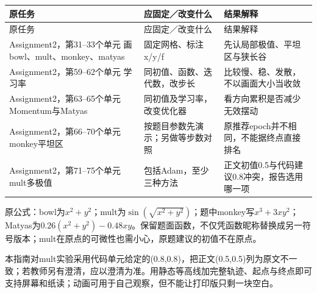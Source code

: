 \begingroup
\small\setlength{\tabcolsep}{3pt}
\renewcommand{\arraystretch}{1.22}
\begin{longtable}{@{}>{\raggedright\arraybackslash}p{}>{\raggedright\arraybackslash}p{}>{\raggedright\arraybackslash}p{}@{}}
\toprule
原任务 & 应固定／改变什么 & 结果解释 \\
\midrule\endfirsthead
原任务 & 应固定／改变什么 & 结果解释 \\
\midrule\endhead
\bottomrule\endfoot
Assignment2，第31–33个单元 画bowl、mult、monkey、matyas & 固定网格、标注x/y/f & 先认局部极值、平坦区与狭长谷 \\
Assignment2，第59–62个单元 学习率 & 同初值、函数、迭代数，改步长 & 比较慢、稳、发散，不以画面大小当收敛 \\
Assignment2，第63–65个单元 Momentum与Matyas & 同初值及学习率，改变优化器 & 看方向累积是否减少无效摆动 \\
Assignment2，第66–70个单元 monkey平坦区 & 按题目参数先演示；另做等步数对照 & 原推荐epoch并不相同，不能据终点直接排名 \\
Assignment2，第71–75个单元 mult多极值 & 包括Adam，至少三种方法 & 正文初值0.5与代码建议0.8冲突，报告选用哪一项 \\
\end{longtable}
\endgroup


原公式：bowl为\(x^2+y^2\)；mult为\(\sin(\sqrt{x^2+y^2})\)；题中monkey写\(x^3+3xy^2\)；Matyas为\(0.26(x^2+y^2)-0.48xy\)。保留题面函数，不仅凭函数昵称替换成另一符号版本；mult在原点的可微性也需小心，原题建议的初值不在原点。


本指南对mult实验采用代码单元给定的(0.8,0.8)，把正文(0.5,0.5)列为原文不一致；若教师另有澄清，应以澄清为准。用静态等高线加完整轨迹、起点与终点即可支持屏幕和纸读；动画可用于自己观察，但不能让打印版只剩一块空白。





